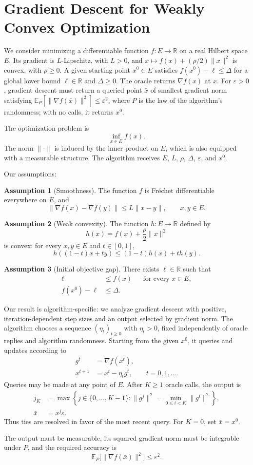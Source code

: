 \documentclass[10pt]{article}
\theoremstyle{definition}
\newtheorem{assumption}{Assumption}
\begin{document}
\section*{Gradient Descent for Weakly Convex Optimization}
We consider minimizing a differentiable function $f:E\to\mathbb{R}$ on a real Hilbert space $E$. Its gradient is $L$-Lipschitz, with $L>0$, and $x\mapsto f(x)+(\rho/2)\|x\|^2$ is convex, with $\rho\geq0$. A given starting point $x^0\in E$ satisfies $f(x^0)-\ell\leq\Delta$ for a global lower bound $\ell\in\mathbb{R}$ and $\Delta\geq0$. The oracle returns $\nabla f(x)$ at $x$. For $\varepsilon>0$, gradient descent must return a queried point $\bar{x}$ of smallest gradient norm satisfying $\mathbb{E}_{P}[\|\nabla f(\bar{x})\|^2]\leq\varepsilon^2$, where $P$ is the law of the algorithm's randomness; with no calls, it returns $x^0$.

The optimization problem is
\[
\inf_{x\in E} f(x).
\]
The norm $\|\cdot\|$ is induced by the inner product on $E$, which is also equipped with a measurable structure. The algorithm receives $E$, $L$, $\rho$, $\Delta$, $\varepsilon$, and $x^0$.

Our assumptions:
\begin{assumption}[Smoothness]
The function $f$ is Fr\'echet differentiable everywhere on $E$, and
\[
\|\nabla f(x)-\nabla f(y)\|\leq L\|x-y\|,
\qquad x,y\in E.
\]
\end{assumption}

\begin{assumption}[Weak convexity]
The function $h:E\to\mathbb{R}$ defined by
\[
h(x)=f(x)+\frac{\rho}{2}\|x\|^2
\]
is convex: for every $x,y\in E$ and $t\in[0,1]$,
\[
h((1-t)x+ty)\leq(1-t)h(x)+t h(y).
\]
\end{assumption}

\begin{assumption}[Initial objective gap]
There exists $\ell\in\mathbb{R}$ such that
\[
\begin{aligned}
\ell&\leq f(x) &&\text{for every }x\in E,\\
f(x^0)-\ell&\leq\Delta.
\end{aligned}
\]
\end{assumption}

Our result is algorithm-specific: we analyze gradient descent with positive, iteration-dependent step sizes and an output selected by gradient norm. The algorithm chooses a sequence $(\eta_t)_{t\geq0}$ with $\eta_t>0$, fixed independently of oracle replies and algorithm randomness. Starting from the given $x^0$, it queries and updates according to
\[
\begin{aligned}
g^t&=\nabla f(x^t),\\
x^{t+1}&=x^t-\eta_t g^t,
\qquad t=0,1,\ldots.
\end{aligned}
\]
Queries may be made at any point of $E$. After $K\geq1$ oracle calls, the output is
\[
\begin{aligned}
j_K&=\max\!\left\{j\in\{0,\ldots,K-1\}:
\|g^j\|^2=\min_{0\leq i<K}\|g^i\|^2\right\},\\
\bar{x}&=x^{j_K}.
\end{aligned}
\]
Thus ties are resolved in favor of the most recent query. For $K=0$, set $\bar{x}=x^0$.

The output must be measurable, its squared gradient norm must be integrable under $P$, and the required accuracy is
\[
\mathbb{E}_{P}\bigl[\|\nabla f(\bar{x})\|^2\bigr]\leq\varepsilon^2.
\]
\end{document}
